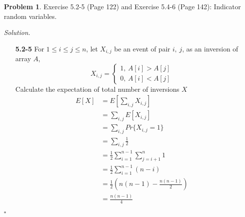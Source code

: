 \documentclass[11pt]{article}
\theoremstyle{definition}
\newtheorem{problem}{Problem}
\newenvironment{solution}{\noindent\emph{Solution.}}{\hfill$\square$}
\begin{document}
\newpage



\begin{problem}Exercise 5.2-5 (Page 122) and Exercise 5.4-6 (Page 142): Indicator random variables.
\end{problem}

\begin{solution}
  \begin{enumerate}
  
    \item[\textbf{5.2-5}]
    For $1 \leq i \leq j \leq n$, let $X_{i,j}$ be an event of pair $i, \ j$, as an inversion of array $A$,
    $$X_{i,j}=
\left \{
\begin{aligned}
1,\  A[i] > A[j]\\
0, \ A[i]< A[j]
\end{aligned}
\right.
$$
Calculate the expectation of total number of inversions $X$
\begin{align*}
E \left[  X \right] &= E \left[ \sum_{i,j}X_{i,j} \right] \\
& = \sum_{i,j} E \left[ X_{i,j} \right] \\
& = \sum_{i,j} Pr \{ X_{i,j} =1 \} \\
& = \sum_{i,j} \frac{1}{2} \\
&= \frac{1}{2} \sum_{i=1}^{n-1}\sum_{j=i+1}^n1\\
&= \frac{1}{2} \sum_{i=1}^{n-1} \left(n-i \right) \\
&=  \frac{1}{2}  \left(  n(n-1) -   \frac{n(n-1)}{2}    \right) \\
&= \frac{n(n-1)}{4}
\end{align*}


\end{enumerate}
\end{solution}
\end{document}
